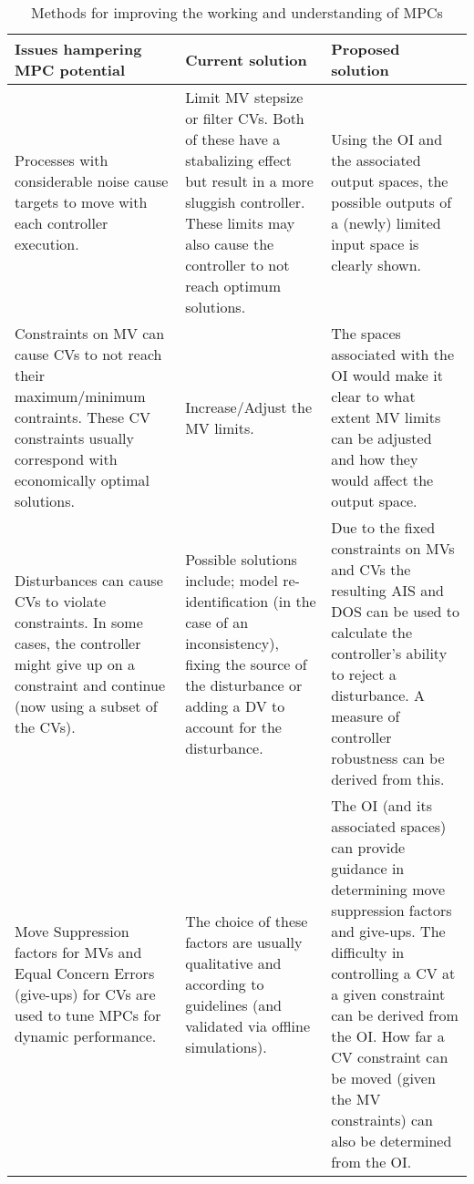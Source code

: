 \begin{landscape}
\begin{table}[htbp]
  \caption[Methods for improving the working and understanding of MPCs]
    {Methods for improving the working and understanding of MPCs}
  \label{tab:mpcissues}
  \centering
  \begin{tabular}{p{8cm} p{8cm} p{8cm}}
    \toprule
    Issues hampering MPC potential & Current solution & Proposed solution \\
    \midrule
    Processes with considerable noise cause targets to move with each
      controller execution.
      & Limit MV stepsize or filter CVs. Both of these have a stabalizing effect
        but result in a more sluggish controller. These limits may also cause
        the controller to not reach optimum solutions.
      & Using the OI and the associated output spaces, the possible outputs of
        a (newly) limited input space is clearly shown.\\
    Constraints on MV can cause CVs to not reach their maximum/minimum
    contraints. These CV constraints usually correspond with economically
    optimal solutions. 
      & Increase/Adjust the MV limits. 
      & The spaces associated with the OI would make it clear to what extent
        MV limits can be adjusted and how they would affect the output space.\\
    Disturbances can cause CVs to violate constraints. In some cases, the
    controller might give up on a constraint and continue (now using a subset
    of the CVs).
      & Possible solutions include; model re-identification (in the case of an
        inconsistency), fixing the source of the disturbance or adding a DV to
        account for the disturbance.
      & Due to the fixed constraints on MVs and CVs the resulting AIS and DOS
        can be used to calculate the controller's ability to reject a
        disturbance. A measure of controller robustness can be derived from
        this.\\
    Move Suppression factors for MVs and Equal Concern Errors (give-ups) for 
    CVs are used to tune MPCs for dynamic performance.
      & The choice of these factors are usually qualitative and according to 
        guidelines (and validated via offline simulations).
      & The OI (and its associated spaces) can provide guidance in determining
        move suppression factors and give-ups. The difficulty in controlling
        a CV at a given constraint can be derived from the OI. How far a CV
        constraint can be moved (given the MV constraints) can also be
        determined from the OI.\\
    \bottomrule
  \end{tabular}
\end{table}
\end{landscape}